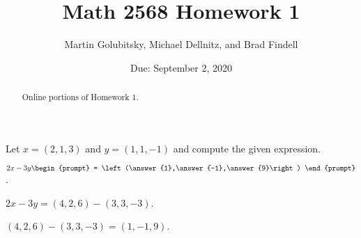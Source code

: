 \documentclass{ximera}
\date{Due: September 2, 2020}
\title{Math 2568 Homework 1}
\author{Martin Golubitsky, Michael Dellnitz, and Brad Findell}
\begin{document}
\begin{abstract}
Online portions of Homework 1.
\end{abstract}
\maketitle


\problemlabel

\noindent Let $x=(2,1,3)$ and  $y=(1,1,-1)$ and compute the given expression.

\begin{exercise}  \label{c1.1.1B}
  $2x-3y\begin{prompt}
    = \left(\answer{1},\answer{-1},\answer{9}\right)
  \end{prompt}$.
  \begin{hint}
    $2x - 3y = (4,2,6) - (3,3,-3)$.
  \end{hint}
  \begin{hint}
    $(4,2,6) - (3,3,-3) = (1,-1,9)$.
  \end{hint}  

%
\end{exercise}





\problemlabel
\end{document}
